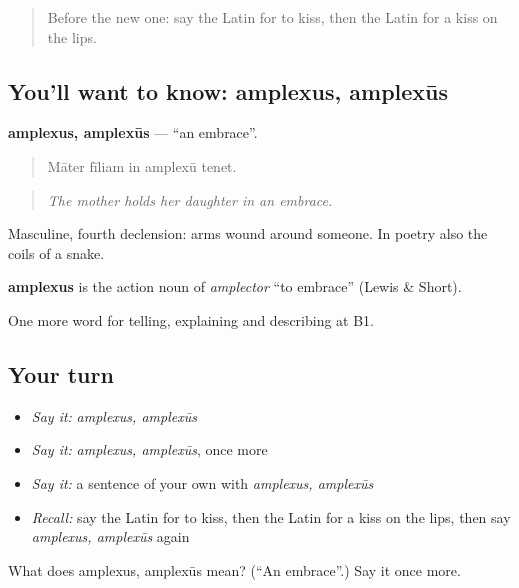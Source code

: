 \label{lesson:LA-C534-amplexus}



\begin{quote}
Before the new one: say the Latin for to kiss, then the Latin for a kiss on the lips.
\end{quote}

\subsection*{You'll want to know: amplexus, amplexūs}
\textbf{amplexus, amplexūs} — \textquotedblleft{}an embrace\textquotedblright{}.

\begin{quote}
Māter fīliam in amplexū tenet.
\end{quote}

\begin{quote}
\emph{The mother holds her daughter in an embrace.}
\end{quote}

Masculine, fourth declension: arms wound around someone. In poetry also the coils of a snake.

\begin{cousinweb}
\textbf{amplexus} is the action noun of \emph{amplector} \textquotedblleft{}to embrace\textquotedblright{} (Lewis \& Short).
\end{cousinweb}

\begin{grammarlens}[title={What you've built}]
One more word for telling, explaining and describing at B1.
\end{grammarlens}

\subsection*{Your turn}
\begin{itemize}
\raggedright
  \item \emph{Say it:} \emph{amplexus, amplexūs}
  \item \emph{Say it:} \emph{amplexus, amplexūs}, once more
  \item \emph{Say it:} a sentence of your own with \emph{amplexus, amplexūs}
  \item \emph{Recall:} say the Latin for to kiss, then the Latin for a kiss on the lips, then say \emph{amplexus, amplexūs} again
\end{itemize}

\begin{tcolorbox}[breakable,colback=teal!4,colframe=teal!35!black,title={Before you move on}]
What does amplexus, amplexūs mean? (\textquotedblleft{}An embrace\textquotedblright{}.) Say it once more.
\end{tcolorbox}
